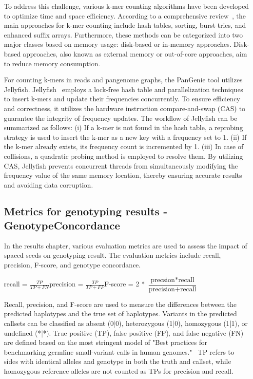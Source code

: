 \documentclass{PHlab-thesis}
\begin{document}
To address this challenge, various k-mer counting algorithms have been developed to optimize time and space efficiency. According to a comprehensive review~\cite{Man2018benchmark}, the main approaches for k-mer counting include hash tables, sorting, burst tries, and enhanced suffix arrays. Furthermore, these methods can be categorized into two major classes based on memory usage: disk-based or in-memory approaches. Disk-based approaches, also known as external memory or out-of-core approaches, aim to reduce memory consumption.

For counting k-mers in reads and pangenome graphs, the PanGenie tool utilizes Jellyfish. Jellyfish~\cite{Mar2011Jellyfish} employs a lock-free hash table and parallelization techniques to insert k-mers and update their frequencies concurrently. To ensure efficiency and correctness, it utilizes the hardware instruction compare-and-swap (CAS) to guarantee the integrity of frequency updates. The workflow of Jellyfish can be summarized as follows: (i) If a k-mer is not found in the hash table, a reprobing strategy is used to insert the k-mer as a new key with a frequency set to 1. (ii) If the k-mer already exists, its frequency count is incremented by 1. (iii) In case of collisions, a quadratic probing method is employed to resolve them. By utilizing CAS, Jellyfish prevents concurrent threads from simultaneously modifying the frequency value of the same memory location, thereby ensuring accurate results and avoiding data corruption.
\subsection{Metrics for genotyping results - GenotypeConcordance}
In the results chapter, various evaluation metrics are used to assess the impact of spaced seeds on genotyping result. The evaluation metrics include recall, precision, F-score, and genotype concordance.
\begin{center}
    recall = $\frac{TP}{TP + FN}$\hspace{0.5cm}precision = $\frac{TP}{TP + FP}$\hspace{0.5cm}F-score = 2 * $\dfrac{\text{precsion}*\text{recall}}{\text{precision} + \text{recall}}$
\end{center}

Recall, precision, and F-score are used to measure the differences between the predicted haplotypes and the true set of haplotypes. Variants in the predicted callsets can be classified as absent (0|0), heterozygous (1|0), homozygous (1|1), or undefined (*|*). True positive (TP), false positive (FP), and false negative (FN) are defined based on the most stringent model of "Best practices for benchmarking germline small-variant calls in human genomes."~\cite{Peter2019Metrics} TP refers to sides with identical alleles and genotype in both the truth and callset, while homozygous reference alleles are not counted as TPs for precision and recall.
\end{document}
